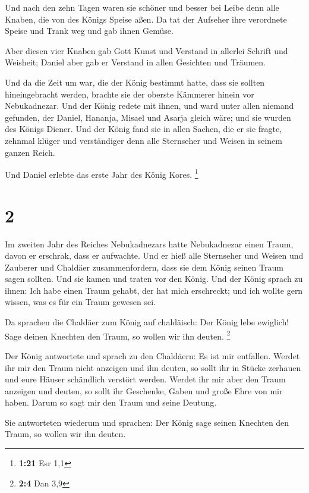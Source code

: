  Und nach den zehn Tagen waren sie schöner und besser bei
Leibe denn alle Knaben, die von des Königs Speise aßen.  Da
tat der Aufseher ihre verordnete Speise und Trank weg und gab ihnen
Gemüse.

 Aber diesen vier Knaben gab Gott Kunst und Verstand in
allerlei Schrift und Weisheit; Daniel aber gab er Verstand in allen
Gesichten und Träumen.

 Und da die Zeit um war, die der König bestimmt hatte, dass
sie sollten hineingebracht werden, brachte sie der oberste Kämmerer
hinein vor Nebukadnezar.  Und der König redete mit ihnen,
und ward unter allen niemand gefunden, der Daniel, Hananja, Misael und
Asarja gleich wäre; und sie wurden des Königs Diener.  Und
der König fand sie in allen Sachen, die er sie fragte, zehnmal klüger
und verständiger denn alle Sternseher und Weisen in seinem ganzen Reich.

 Und Daniel erlebte das erste Jahr des König Kores.
\footnote{\textbf{1:21} Esr 1,1}

\hypertarget{section-1}{%
\section{2}\label{section-1}}

 Im zweiten Jahr des Reiches Nebukadnezars hatte
Nebukadnezar einen Traum, davon er erschrak, dass er aufwachte.
 Und er hieß alle Sternseher und Weisen und Zauberer und
Chaldäer zusammenfordern, dass sie dem König seinen Traum sagen sollten.
Und sie kamen und traten vor den König.  Und der König
sprach zu ihnen: Ich habe einen Traum gehabt, der hat mich erschreckt;
und ich wollte gern wissen, was es für ein Traum gewesen sei.

 Da sprachen die Chaldäer zum König auf chaldäisch: Der
König lebe ewiglich! Sage deinen Knechten den Traum, so wollen wir ihn
deuten. \footnote{\textbf{2:4} Dan 3,9}

 Der König antwortete und sprach zu den Chaldäern: Es ist
mir entfallen. Werdet ihr mir den Traum nicht anzeigen und ihn deuten,
so sollt ihr in Stücke zerhauen und eure Häuser schändlich verstört
werden.  Werdet ihr mir aber den Traum anzeigen und deuten,
so sollt ihr Geschenke, Gaben und große Ehre von mir haben. Darum so
sagt mir den Traum und seine Deutung.

 Sie antworteten wiederum und sprachen: Der König sage
seinen Knechten den Traum, so wollen wir ihn deuten.

